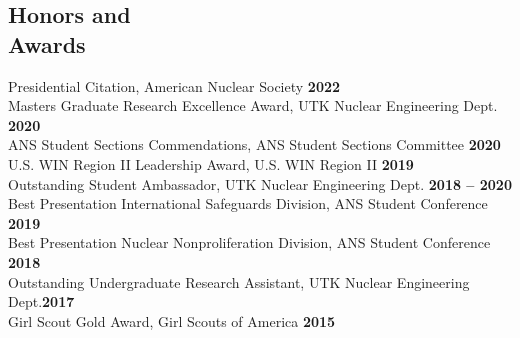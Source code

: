 \documentclass[margin,line]{resume}
\begin{document}
\begin{resume}
    \section{\mysidestyle Honors and\\Awards}
                Presidential Citation, American Nuclear Society \hfill \textbf{2022}\vspace{.5mm}\\
                Masters Graduate Research Excellence Award, UTK Nuclear Engineering Dept. \hfill \textbf{2020}\vspace{.5mm}\\%
                ANS Student Sections Commendations, ANS Student Sections Committee \hfill \textbf{2020}\vspace{.5mm}\\%
                U.S. WIN Region II Leadership Award, U.S. WIN Region II \hfill \textbf{2019}\vspace{.5mm}\\%
                Outstanding Student Ambassador, UTK Nuclear Engineering Dept. \hfill \textbf{2018 -- 2020}\vspace{.5mm}\\%
                Best Presentation International Safeguards Division, ANS Student Conference \hfill \textbf{2019}\vspace{0.5mm}\\%
                Best Presentation Nuclear Nonproliferation Division, ANS Student Conference \hfill \textbf{2018}\vspace{0.5mm}\\%
                Outstanding Undergraduate Research Assistant, UTK Nuclear Engineering Dept.\hfill \textbf{2017}\vspace{.5mm}\\%
                Girl Scout Gold Award, Girl Scouts of America \hfill \textbf{2015}\vspace{.5mm}\\%


\end{resume}
\end{document}
